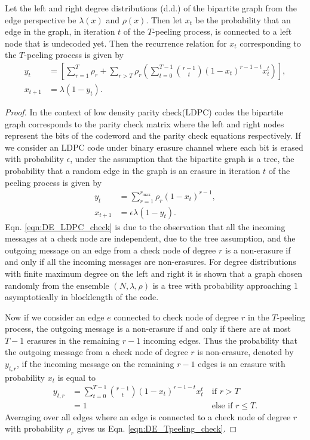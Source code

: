 \documentclass[final,onecolumn,12pt]{IEEEtran}
\begin{document}
\begin{lemma}
Let the left and right degree distributions (d.d.) of the bipartite graph from the edge perspective be $\lambda(x)$ and $\rho(x)$. Then let $x_{t}$ be the probability that an edge in the graph, in iteration $t$ of the $T$-peeling process, is connected to a left node that is undecoded yet. Then the recurrence relation for $x_t$ corresponding to the $T$-peeling process is given by
\begin{align}
y_{t}&=\left[\sum_{r=1}^{T} \rho_r +\sum_{r>T} \rho_r\left( \sum_{t=0}^{T-1}\binom{r-1}{t}(1-x_t)^{r-1-t} x_t^{t}\right) \right],\label{eqn:DE_Tpeeling_check}\\
x_{t+1}&=\lambda(1-y_t).\label{eqn:DE_Tpeeling_bit}
\end{align}
\label{lem:DE_Tpeeling}
\end{lemma}
\begin{proof}
In the context of low density parity check(LDPC) codes the bipartite graph corresponds to the parity check matrix where the left and right nodes represent the bits of the codeword and the parity check equations respectively. If we consider an LDPC code under binary erasure channel where each bit is erased with probability $\epsilon$, under the assumption that the bipartite graph is a tree, the probability that a random edge in the graph is an erasure in iteration $t$ of the peeling process is given by \cite{richardson2008modern}
\begin{align}
y_{t}&=\sum_{r=1}^{r_{\max}} \rho_r (1-x_t)^{r-1}, \label{eqn:DE_LDPC_check}\\
x_{t+1}&=\epsilon \lambda(1-y_t).\label{eqn:DE_LDPC_bit}
\end{align}
Eqn. \eqref{eqn:DE_LDPC_check} is due to the observation that all the incoming messages at a check node are independent, due to the tree assumption, and the outgoing message on an edge from a check node of degree $r$ is a non-erasure if and only if all the incoming messages are non-erasures. For degree distributions with finite maximum degree on the left and right it is shown that a graph chosen randomly from the ensemble $(N,\lambda,\rho)$ is a tree with probability approaching $1$ asymptotically in blocklength of the code.

Now if we consider an edge $e$ connected to check node of degree $r$ in the $T$-peeling process, the outgoing message is a non-erasure if and only if there are at most $T-1$ erasures in the remaining $r-1$ incoming edges. Thus the probability that the outgoing message from a check node of degree $r$ is non-erasure, denoted by $y_{t,r}$, if the incoming message on the remaining $r-1$ edges is an erasure with probability $x_t$ is equal to
\begin{align*}
y_{t,r}&=\sum_{t=0}^{T-1}\binom{r-1}{t}(1-x_t)^{r-1-t} x_t^{t}  ~&\text{if } r>T\\
&=1 ~&\text{else if } r\leq T.
\end{align*}
Averaging over all edges where an edge is connected to a check node of degree $r$ with probability $\rho_r$ gives us Eqn. \eqref{eqn:DE_Tpeeling_check}.
\end{proof}
\end{document}
